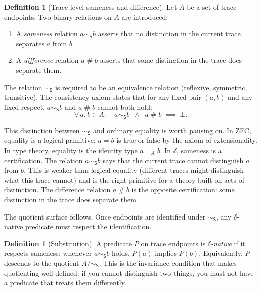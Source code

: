 \documentclass[11pt,a4paper]{article}
\theoremstyle{definition}
\newtheorem{definition}[theorem]{Definition}
\theoremstyle{remark}
\begin{document}
\begin{definition}[Trace-level sameness and difference]\label{def:samediff}
Let $A$ be a set of trace endpoints. Two binary relations on $A$ are
introduced:
\begin{enumerate}[leftmargin=2em, label=(\roman*)]
  \item A \emph{sameness} relation $a \sim_{\mathsf{S}} b$ asserts that no
    distinction in the current trace separates $a$ from $b$.
  \item A \emph{difference} relation $a \mathbin{\#} b$ asserts that some
    distinction in the trace does separate them.
\end{enumerate}
The relation $\sim_{\mathsf{S}}$ is required to be an equivalence relation
(reflexive, symmetric, transitive). The consistency axiom states that for any
fixed pair $(a,b)$ and any fixed respect, $a \sim_{\mathsf{S}} b$ and
$a \mathbin{\#} b$ cannot both hold:
\[
  \forall\, a, b \in A: \quad
  a \sim_{\mathsf{S}} b \;\;\wedge\;\; a \mathbin{\#} b
  \;\implies\; \bot.
\]
\end{definition}

This distinction between $\sim_{\mathsf{S}}$ and ordinary equality is worth
pausing on. In ZFC, equality is a logical primitive: $a = b$ is true or false
by the axiom of extensionality. In type theory, equality is the identity type
$a =_A b$. In $\delta$, sameness is a certification. The relation
$a \sim_{\mathsf{S}} b$ says that the current trace cannot distinguish $a$
from $b$. This is weaker than logical equality (different traces might
distinguish what this trace cannot) and is the right primitive for a theory
built on acts of distinction. The difference relation $a \mathbin{\#} b$
is the opposite certification: some distinction in the trace does separate
them.

The quotient surface follows. Once endpoints are identified under
$\sim_{\mathsf{S}}$, any $\delta$-native predicate must respect the
identification.

\begin{definition}[Substitution]\label{def:subst}
A predicate $P$ on trace endpoints is \emph{$\delta$-native} if it respects
sameness: whenever $a \sim_{\mathsf{S}} b$ holds, $P(a)$ implies $P(b)$.
Equivalently, $P$ descends to the quotient $A / {\sim_{\mathsf{S}}}$. This is
the invariance condition that makes quotienting well-defined: if you cannot
distinguish two things, you must not have a predicate that treats them
differently.
\end{definition}
\end{document}
